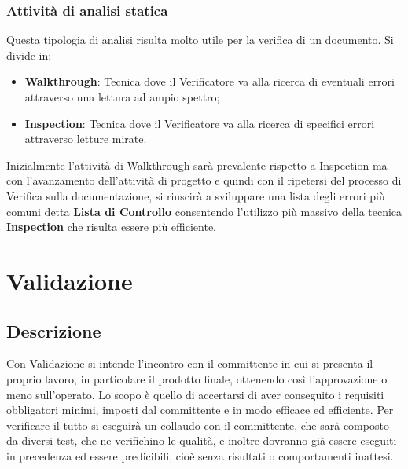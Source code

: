 \subsubsection{Attività di analisi statica}
Questa tipologia di analisi risulta molto utile per la verifica di un documento. Si divide in:
\begin{itemize}
  \item \textbf{Walkthrough}: Tecnica dove il Verificatore va alla ricerca di eventuali errori attraverso una lettura ad ampio spettro;
  \item \textbf{Inspection}: Tecnica dove il Verificatore va alla ricerca di specifici errori attraverso letture mirate.
\end{itemize}
Inizialmente l'attività di Walkthrough sarà prevalente rispetto a Inspection ma
con l'avanzamento dell'attività di progetto e quindi con il ripetersi del processo di Verifica sulla documentazione, si riuscirà a sviluppare una lista degli errori più comuni detta \textbf{Lista di Controllo} consentendo l'utilizzo più massivo della tecnica \textbf{Inspection} che risulta essere più efficiente.

\section{Validazione}
\subsection{Descrizione}
Con Validazione si intende l'incontro con il committente in cui si presenta il proprio lavoro, in particolare il
prodotto finale, ottenendo così l'approvazione o meno sull'operato. \newline
Lo scopo è quello di accertarsi di aver conseguito i requisiti obbligatori minimi, imposti dal committente e
in modo efficace ed efficiente. Per verificare il tutto si eseguirà un collaudo con il committente, che sarà composto
da diversi test, che ne verifichino le qualità, e inoltre dovranno già essere eseguiti in precedenza ed essere
predicibili, cioè senza risultati o comportamenti inattesi.
